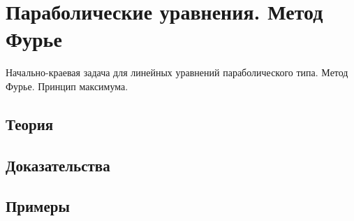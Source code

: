 
\section{Параболические уравнения. Метод Фурье}
\label{sec:2.1.03-parabolic-fourier}

\begin{ticket}
Начально-краевая задача для линейных уравнений параболического типа. Метод Фурье. Принцип максимума.
\end{ticket}

\subsection*{Теория}

\subsection*{Доказательства}

\subsection*{Примеры}

